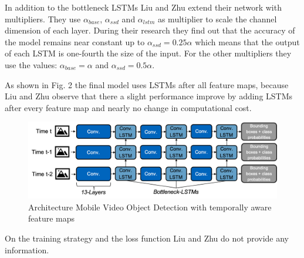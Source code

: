 \documentclass[conference]{IEEEtran}
\begin{document}
In addition to the bottleneck LSTMs Liu and Zhu extend their network with multipliers. They use $\alpha_{base}$, $\alpha_{ssd}$ and $\alpha_{lstm}$ as multiplier to scale the channel dimension of each layer. During their research they find out that the accuracy of the model remains near constant up to $\alpha_{ssd}= 0.25 \alpha$ which means that the output of each LSTM is one-fourth the size of the input. For the other multipliers they use the values: $\alpha_{base} = \alpha$ and $\alpha_{ssd} = 0.5 \alpha$. \newline

As shown in Fig. 2 the final model uses LSTMs after all feature maps, because Liu and Zhu observe that there a slight performance improve by adding LSTMs after every feature map and nearly no change in computational cost. 

\begin{figure} [h]
\includegraphics[width=\columnwidth]{Liu_Zhu}
\caption{Architecture Mobile Video Object Detection with temporally aware feature maps}
\end{figure}

On the training strategy and the loss function Liu and Zhu do not provide any information.
\end{document}
